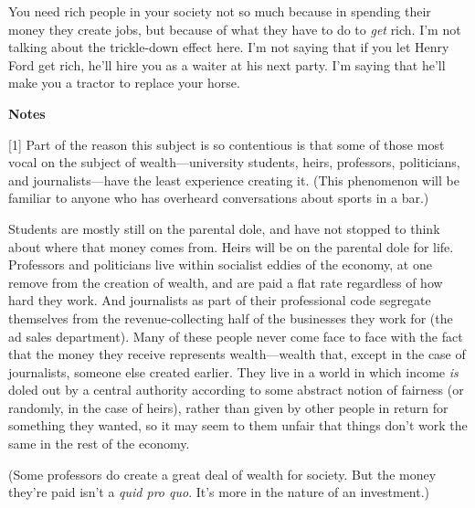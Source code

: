 You need rich people in your
                  society not so much because in spending their money they
                  create jobs, but because of what they have to do to
                  \emph{get} rich. I'm not talking about the trickle-down effect
                  here. I'm not saying that if you let Henry Ford get rich,
                  he'll hire you as a waiter at his next party. I'm saying that
                  he'll make you a tractor to replace your horse.



\textbf{Notes}

[1] Part of the reason this subject is so contentious is that
                  some of those most vocal on the subject of
                  wealth---university students, heirs, professors,
                  politicians, and journalists---have the least experience
                  creating it. (This phenomenon will be familiar to anyone who
                  has overheard conversations about sports in a bar.)

Students
                  are mostly still on the parental dole, and have not stopped to
                  think about where that money comes from. Heirs will be on the
                  parental dole for life. Professors and politicians live within
                  socialist eddies of the economy, at one remove from the
                  creation of wealth, and are paid a flat rate regardless of how
                  hard they work. And journalists as part of their professional
                  code segregate themselves from the revenue-collecting half of
                  the businesses they work for (the ad sales department). Many
                  of these people never come face to face with the fact that the
                  money they receive represents wealth---wealth that, except
                  in the case of journalists, someone else created earlier. They
                  live in a world in which income \emph{is} doled out by a
                  central authority according to some abstract notion of
                  fairness (or randomly, in the case of heirs), rather than
                  given by other people in return for something they wanted, so
                  it may seem to them unfair that things don't work the same in
                  the rest of the economy.

(Some professors do create
                  a great deal of wealth for society. But the money they're paid
                  isn't a \emph{quid pro quo}. It's more in the nature of an
                  investment.)

